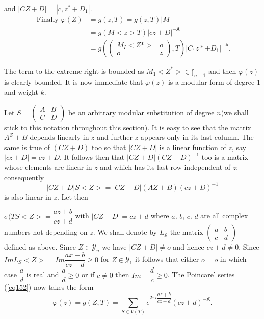  \noindent
 and $| C Z + D | = | c, z^* + D_1 |$.
\begin{align*}
\text {  Finally  } \varphi (Z) & = g (z, T) = g (z, T) | M\\
& = g (M <z> T) |c z + D |^{- \mathfrak{K}}\\
& = g 
 \left(
\begin{pmatrix}
M_I <Z*> & o \\ o & z
\end{pmatrix},
  T \right ) |C_1 z* + D_1 |^{-\mathfrak{K}}.
\end{align*}


The term to the extreme right is bounded as $M_1 <Z^*> \in
\mathfrak{f}_{n -1}$ and then $\varphi (z)$ is clearly bounded. It is
now immediate that $\varphi (z)$ is a modular form of  degree 1 and
weight $k$. 

Let $S = \begin{pmatrix} A & B \\ C & D \end{pmatrix}$ be an arbitrary
modular substitution of degree $n$\pageoriginale  (we shall stick to
this notation 
throughout this section). It is easy to see that the matrix $A^Z +B$
depends linearly in $z$ and further $z$ appears only in its last
column. The same is true of $(CZ + D)$ too so that $| C Z + D|$ is a
linear function of $z$, say $| c z + D| = cz + D$. It follows then
that $| CZ + D| (CZ + D)^{-1}$ too is a matrix whose elements are
linear in $z$ and which has its last row independent of $z$;
consequently 
\begin{equation*}
| CZ + D| S <Z> = | CZ + D | (AZ + B)(cz + D)^{-1} \tag{179}\label{eq179}
\end{equation*}
is also linear in $z$. Let then 

\noindent
$\sigma (T S <Z> = \dfrac{a z + b}{cz + d}$ with $| CZ + D| = cz + d$
where $a$, $b$, $c$, $d$ are all complex numbers not depending on $z$. We
shall denote by $L_{\mathscr{S}}$ the matrix $\begin{pmatrix} a & b
  \\ c & d \end{pmatrix}$ defined as above. Since $Z \in
\mathscr{Y}_n$ we have $| CZ + D | \neq o$ and hence $cz + d \neq
0$. Since $I m L_S <Z> = I m \dfrac{a x + b}{cz + d} \ge 0$ for $Z \in
\mathscr{Y}_1$ it follows that either $o = o$ in which case
$\dfrac{a}{d}$ is real and $\dfrac{a}{d} \ge 0$ or if $c \neq 0$ then
$I m - \dfrac{d}{c} \ge 0$. The Poincare' series (\ref{eq152}) now takes the
form  
\begin{equation*}
\varphi (z) = g (Z, T) = \sum_{S \in V(T)} e^{2 \pi i \dfrac{az +
    b}{cz + d}} (cz + d)^{- \mathfrak{K}}. \tag{180}\label{eq180} 
\end{equation*}

